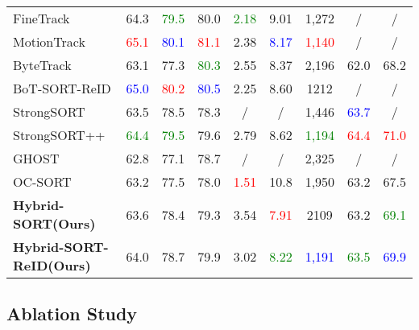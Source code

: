 \documentclass[letterpaper]{article} \usepackage{aaai23}  \usepackage{times}  \usepackage{helvet}  \usepackage{courier}  \usepackage[hyphens]{url}  \usepackage{graphicx} \urlstyle{rm} \def\UrlFont{\rm}  \usepackage{natbib}  \usepackage{caption} \frenchspacing  \setlength{\pdfpagewidth}{8.5in}  \setlength{\pdfpageheight}{11in}  \usepackage{algorithm}
\begin{document}
\begin{table*}[!ht]
\begin{center}
{\begin{tabular}{l|cccccccc}
FineTrack \textcolor{blue}{\cite{ren2023focus}} & 64.3 & \textcolor{green}{79.5} & 80.0 & \textcolor{green}{2.18} & 9.01 & 1,272 & / & / \\
MotionTrack \textcolor{blue}{\cite{qin2023motiontrack}} & \textcolor{red}{65.1}  & \textcolor{blue}{80.1} & \textcolor{red}{81.1} & 2.38 & \textcolor{blue}{8.17} & \textcolor{red}{1,140} & / & / \\
\rowcolor{blue!10} ByteTrack \textcolor{blue}{\cite{zhang2022bytetrack}}  & 63.1 & 77.3 & \textcolor{green}{80.3} & 2.55 & 8.37 & 2,196 & 62.0 & 68.2 \\
\rowcolor{blue!10} BoT-SORT-ReID \textcolor{blue}{\cite{aharon2022bot}}  & \textcolor{blue}{65.0} & \textcolor{red}{80.2} & \textcolor{blue}{80.5} & 2.25 & 8.60 & 1212 & / & / \\
\rowcolor{blue!10} StrongSORT \textcolor{blue}{\cite{du2023strongsort}}  & 63.5 & 78.5 & 78.3 &  / &  / & 1,446 & \textcolor{blue}{63.7} &  / \\
\rowcolor{blue!10} StrongSORT++ \textcolor{blue}{\cite{du2023strongsort}}  & \textcolor{green}{64.4} & \textcolor{green}{79.5} & 79.6  & 2.79 & 8.62 & \textcolor{green}{1,194} & \textcolor{red}{64.4} & \textcolor{red}{71.0} \\
\rowcolor{blue!10} GHOST \textcolor{blue}{\cite{seidenschwarz2023simple}}  & 62.8 & 77.1 & 78.7 & / & / & 2,325 & / & / \\
\rowcolor{blue!10} OC-SORT \textcolor{blue}{\cite{cao2023observation}}  & 63.2 & 77.5 & 78.0 & \textcolor{red}{1.51} & 10.8 & 1,950 & 63.2 & 67.5 \\
\rowcolor{blue!10} \textbf{Hybrid-SORT(Ours)}  & 63.6 & 78.4 & 79.3 & 3.54 & \textcolor{red}{7.91} & 2109 & 63.2 & \textcolor{green}{69.1} \\
\rowcolor{blue!10} \textbf{Hybrid-SORT-ReID(Ours)}  & 64.0 & 78.7 & 79.9 & 3.02 & \textcolor{green}{8.22} & \textcolor{blue}{1,191} & \textcolor{green}{63.5} & \textcolor{blue}{69.9}\\
\hline

\end{tabular}

}
\end{center}
\end{table*}



\subsection{Ablation Study}
\end{document}
